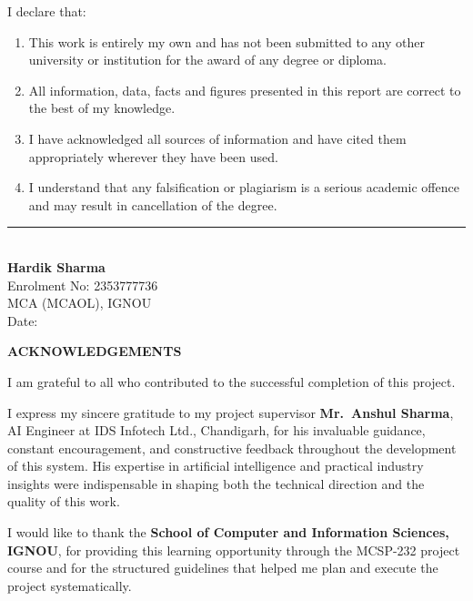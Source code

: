 \documentclass[12pt,a4paper]{report}
\begin{document}
I declare that:
\begin{enumerate}
    \item This work is entirely my own and has not been submitted to any other university or institution for the award of any degree or diploma.
    \item All information, data, facts and figures presented in this report are correct to the best of my knowledge.
    \item I have acknowledged all sources of information and have cited them appropriately wherever they have been used.
    \item I understand that any falsification or plagiarism is a serious academic offence and may result in cancellation of the degree.
\end{enumerate}

\vspace{2cm}

\begin{flushleft}
\rule{6cm}{0.5pt}\\
\textbf{Hardik Sharma}\\
Enrolment No: 2353777736\\
MCA (MCAOL), IGNOU\\
Date: \underline{\hspace{3cm}}
\end{flushleft}

\newpage
\thispagestyle{empty}
\begin{center}
    {\Large \textbf{ACKNOWLEDGEMENTS}}
\end{center}
\vspace{0.5cm}

I am grateful to all who contributed to the successful completion of this project.

I express my sincere gratitude to my project supervisor \textbf{Mr.~Anshul Sharma}, AI Engineer at IDS Infotech Ltd., Chandigarh, for his invaluable guidance, constant encouragement, and constructive feedback throughout the development of this system. His expertise in artificial intelligence and practical industry insights were indispensable in shaping both the technical direction and the quality of this work.

I would like to thank the \textbf{School of Computer and Information Sciences, IGNOU}, for providing this learning opportunity through the MCSP-232 project course and for the structured guidelines that helped me plan and execute the project systematically.
\end{document}
